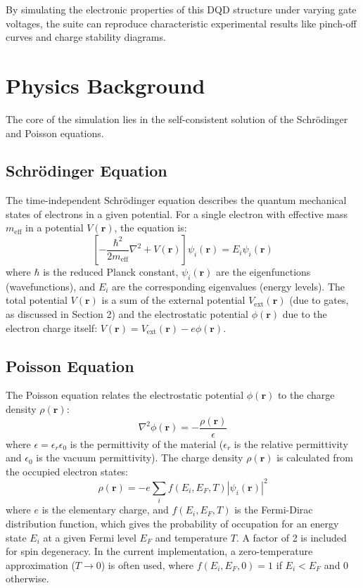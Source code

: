 \documentclass{article}
\begin{document}
By simulating the electronic properties of this DQD structure under varying gate voltages, the suite can reproduce characteristic experimental results like pinch-off curves and charge stability diagrams.

\section{Physics Background}
The core of the simulation lies in the self-consistent solution of the Schrödinger and Poisson equations.

\subsection{Schrödinger Equation}
The time-independent Schrödinger equation describes the quantum mechanical states of electrons in a given potential. For a single electron with effective mass $m_{\text{eff}}$ in a potential $V(\mathbf{r})$, the equation is:
\begin{equation}
    \left[ -\frac{\hbar^2}{2m_{\text{eff}}} \nabla^2 + V(\mathbf{r}) \right] \psi_i(\mathbf{r}) = E_i \psi_i(\mathbf{r})
\end{equation}
where $\hbar$ is the reduced Planck constant, $\psi_i(\mathbf{r})$ are the eigenfunctions (wavefunctions), and $E_i$ are the corresponding eigenvalues (energy levels). The total potential $V(\mathbf{r})$ is a sum of the external potential $V_{\text{ext}}(\mathbf{r})$ (due to gates, as discussed in Section 2) and the electrostatic potential $\phi(\mathbf{r})$ due to the electron charge itself: $V(\mathbf{r}) = V_{\text{ext}}(\mathbf{r}) - e \phi(\mathbf{r})$.

\subsection{Poisson Equation}
The Poisson equation relates the electrostatic potential $\phi(\mathbf{r})$ to the charge density $\rho(\mathbf{r})$:
\begin{equation}
    \nabla^2 \phi(\mathbf{r}) = -\frac{\rho(\mathbf{r})}{\epsilon}
\end{equation}
where $\epsilon = \epsilon_r \epsilon_0$ is the permittivity of the material ($\epsilon_r$ is the relative permittivity and $\epsilon_0$ is the vacuum permittivity). The charge density $\rho(\mathbf{r})$ is calculated from the occupied electron states:
\begin{equation}
    \rho(\mathbf{r}) = -e \sum_i f(E_i, E_F, T) |\psi_i(\mathbf{r})|^2
\end{equation}
where $e$ is the elementary charge, and $f(E_i, E_F, T)$ is the Fermi-Dirac distribution function, which gives the probability of occupation for an energy state $E_i$ at a given Fermi level $E_F$ and temperature $T$. A factor of 2 is included for spin degeneracy. In the current implementation, a zero-temperature approximation ($T \to 0$) is often used, where $f(E_i, E_F, 0) = 1$ if $E_i < E_F$ and $0$ otherwise.
\end{document}
